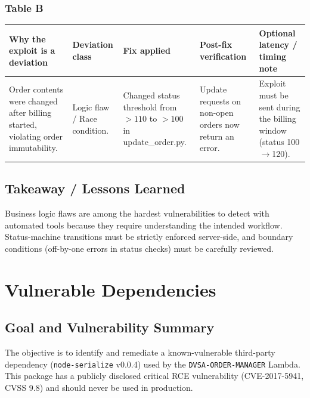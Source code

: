 \documentclass[12pt]{report}
\begin{document}
\subsection*{Table B}
\begin{table}[H]
  \footnotesize
  \centering
  \begin{tabularx}{\textwidth}{|Y|Y|Y|Y|Y|}
    \hline
    \textbf{Why the exploit is a deviation} & \textbf{Deviation class} & \textbf{Fix applied} & \textbf{Post-fix verification} & \textbf{Optional latency / timing note} \\
    \hline
    Order contents were changed after billing started, violating order immutability. &
    Logic flaw / Race condition. &
    Changed status threshold from $>110$ to $>100$ in update\_order.py. &
    Update requests on non-open orders now return an error. &
    Exploit must be sent during the billing window (status 100$\rightarrow$120). \\
    \hline
  \end{tabularx}
\end{table}

\section{Takeaway / Lessons Learned}
Business logic flaws are among the hardest vulnerabilities to detect with automated tools because they require understanding the intended workflow. Status-machine transitions must be strictly enforced server-side, and boundary conditions (off-by-one errors in status checks) must be carefully reviewed.

\clearpage

\chapter{Vulnerable Dependencies}

\section{Goal and Vulnerability Summary}
The objective is to identify and remediate a known-vulnerable third-party dependency (\texttt{node-serialize} v0.0.4) used by the \texttt{DVSA-ORDER-MANAGER} Lambda. This package has a publicly disclosed critical RCE vulnerability (CVE-2017-5941, CVSS 9.8) and should never be used in production.
\end{document}
